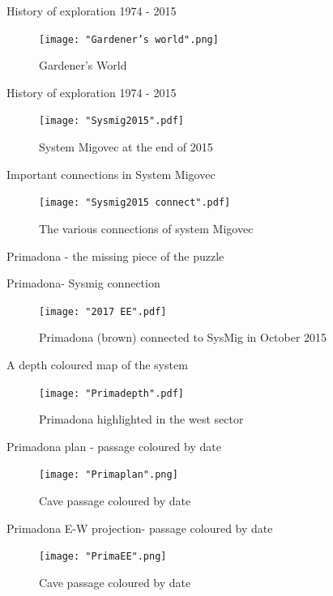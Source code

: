 \documentclass[10pt]{beamer}
\begin{document}
\begin{frame}{History of exploration 1974 - 2015}
    \begin{figure}[!ht]
    \centering
    \texttt{[image: "Gardener's world".png]}
    \caption{Gardener's World}
    \end{figure}
\end{frame}

\begin{frame}{History of exploration 1974 - 2015}
    \begin{figure}[!ht]
    \centering
    \texttt{[image: "Sysmig2015".pdf]}
    \caption{System Migovec at the end of 2015}
    \end{figure}
\end{frame}

\begin{frame}{Important connections in System Migovec}
    \begin{figure}[!ht]
    \centering
    \texttt{[image: "Sysmig2015 connect".pdf]}
    \caption{The various connections of system Migovec}
    \end{figure}
\end{frame}

\begin{frame}[standout]
Primadona - the missing piece of the puzzle
\end{frame}

\begin{frame}{Primadona- Sysmig connection}
    \begin{figure}[!ht]
    \centering
    \texttt{[image: "2017 EE".pdf]}
    \caption{Primadona (brown) connected to SysMig in October 2015}
    \end{figure}
\end{frame} 

\begin{frame}{A depth coloured map of the system}
    \begin{figure}[!ht]
    \centering
    \texttt{[image: "Primadepth".pdf]}
    \caption{Primadona highlighted in the west sector}
    \end{figure}
\end{frame} 


\begin{frame}{Primadona plan - passage coloured by date}
    \begin{figure}[!ht]
    \centering
    \texttt{[image: "Primaplan".png]}
    \caption{Cave passage coloured by date}
    \end{figure}
\end{frame} 
\begin{frame}{Primadona E-W projection- passage coloured by date}
    \begin{figure}[!ht]
    \centering
    \texttt{[image: "PrimaEE".png]}
    \caption{Cave passage coloured by date}
    \end{figure}
\end{frame} 
\end{document}

